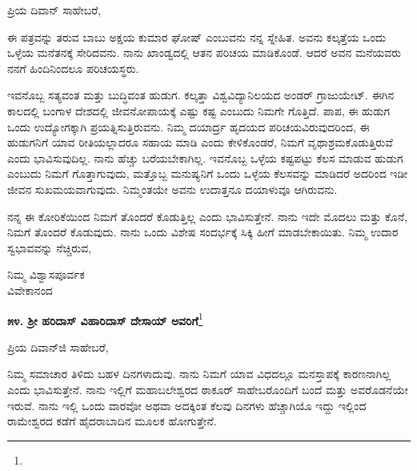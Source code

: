 \vspace{-0.35cm}

\noindent
ಪ್ರಿಯ ದಿವಾನ್ ಸಾಹೇಬರೆ,

ಈ ಪತ್ರವನ್ನು ತರುವ ಬಾಬು ಅಕ್ಷಯ ಕುಮಾರ ಘೋಷ್ ಎಂಬುವನು ನನ್ನ ಸ್ನೇಹಿತ. ಅವನು ಕಲ್ಕತ್ತೆಯ ಒಂದು ಒಳ್ಳೆಯ ಮನೆತನಕ್ಕೆ ಸೇರಿದವನು. ನಾನು ಖಾಂಡ್ವದಲ್ಲಿ ಆತನ ಪರಿಚಯ ಮಾಡಿಕೊಂಡೆ. ಆದರೆ ಅವನ ಮನೆಯವರು ನನಗೆ ಹಿಂದಿನಿಂದಲೂ ಪರಿಚಯಸ್ಥರು.

ಇವನೊಬ್ಬ ಸತ್ಯವಂತ ಮತ್ತು ಬುದ್ಧಿವಂತ ಹುಡುಗ. ಕಲ್ಕತ್ತಾ ವಿಶ್ವವಿದ್ಯಾನಿಲಯದ ಅಂಡರ್ ಗ್ರಾಜುಯೇಟ್. ಈಗಿನ ಕಾಲದಲ್ಲಿ ಬಂಗಾಳ ದೇಶದಲ್ಲಿ ಜೀವನೋಪಾಯಕ್ಕೆ ಎಷ್ಟು ಕಷ್ಟ ಎಂಬುದು ನಿಮಗೇ ಗೊತ್ತಿದೆ. ಪಾಪ, ಈ ಹುಡುಗ ಒಂದು ಉದ್ಯೋಗಕ್ಕಾಗಿ ಪ್ರಯತ್ನಿಸುತ್ತಿರುವನು. ನಿಮ್ಮ ದಯಾರ್ದ್ರ ಹೃದಯದ ಪರಿಚಯವಿರುವುದರಿಂದ, ಈ ಹುಡುಗನಿಗೆ ಯಾವ ರೀತಿಯಲ್ಲಾದರೂ ಸಹಾಯ ಮಾಡಿ ಎಂದು ಕೇಳಿಕೊಂಡರೆ, ನಿಮಗೆ ವೃಥಾಶ್ರಮಕೊಡುತ್ತಿರುವೆ ಎಂದು ಭಾವಿಸುವುದಿಲ್ಲ. ನಾನು ಹೆಚ್ಚು ಬರೆಯಬೇಕಾಗಿಲ್ಲ. ಇವನೊಬ್ಬ ಒಳ್ಳೆಯ ಕಷ್ಟಪಟ್ಟು ಕೆಲಸ ಮಾಡುವ ಹುಡುಗ ಎಂಬುದು ನಿಮಗೆ ಗೊತ್ತಾಗುವುದು, ಮತ್ತೊಬ್ಬ ಮನುಷ್ಯನಿಗೆ ಒಂದು ಒಳ್ಳೆಯ ಕೆಲಸವನ್ನು ಮಾಡಿದರೆ ಅದರಿಂದ ಇಡೀ ಜೀವನ ಸುಖಮಯವಾಗುವುದು. ನಿಮ್ಮಂತಯೇ ಅವನು ಉದಾತ್ತನೂ ದಯಾಳುವೂ ಆಗಿರುವನು.

ನನ್ನ ಈ ಕೋರಿಕೆಯಿಂದ ನಿಮಗೆ ತೊಂದರೆ ಕೊಡುತ್ತಿಲ್ಲ ಎಂದು ಭಾವಿಸುತ್ತೇನೆ. ನಾನು ಇದೇ ಮೊದಲು ಮತ್ತು ಕೊನೆ, ನಿಮಗೆ ತೊಂದರೆ ಕೊಡುವುದು. ನಾನು ಒಂದು ವಿಶೇಷ ಸಂದರ್ಭಕ್ಕೆ ಸಿಕ್ಕಿ ಹೀಗೆ ಮಾಡಬೇಕಾಯಿತು. ನಿಮ್ಮ ಉದಾರ ಸ್ವಭಾವವನ್ನು ನೆಚ್ಚಿರುವ,

\vspace{-0.35cm}

{\flushright
ನಿಮ್ಮ ವಿಶ್ವಾಸಪೂರ್ವಕ\\ವಿವೇಕಾನಂದ\par}

\begin{center}
\textbf{೫೪. ಶ‍್ರೀ ಹರಿದಾಸ್ ವಿಹಾರಿದಾಸ್ ದೇಸಾಯ್ ಅವರಿಗೆ}\footnote{}
\end{center}

\vspace{-0.65cm}

\begin{flushright}
{\fontsize{11pt}{11pt}\selectfont{ಪೂನಾ\\[-2pt] ೧೫ನೇ ಜೂನ್ ೧೮೯೨}}
\end{flushright}

\vspace{-0.35cm}

\noindent
ಪ್ರಿಯ ದಿವಾನ್‌ಜಿ ಸಾಹೇಬರೆ,

ನಿಮ್ಮ ಸಮಾಚಾರ ತಿಳಿದು ಬಹಳ ದಿನಗಳಾದುವು. ನಾನು ನಿಮಗೆ ಯಾವ ವಿಧದಲ್ಲೂ ಮನಸ್ತಾಪಕ್ಕೆ ಕಾರಣನಾಗಿಲ್ಲ ಎಂದು ಭಾವಿಸುತ್ತೇನೆ. ನಾನು ಇಲ್ಲಿಗೆ ಮಹಾಬಲೇಶ್ವರದ ಠಾಕೂರ್ ಸಾಹೇಬರೊಂದಿಗೆ ಬಂದೆ ಮತ್ತು ಅವರೊಡನೆಯೇ ಇರುವೆ. ನಾನು ಇಲ್ಲಿ ಒಂದು ವಾರವೋ ಅಥವಾ ಅದಕ್ಕಿಂತ ಕೆಲವು ದಿನಗಳು ಹೆಚ್ಚಾಗಿಯೊ ಇದ್ದು ಇಲ್ಲಿಂದ ರಾಮೇಶ್ವರದ ಕಡೆಗೆ ಹೈದರಾಬಾದಿನ ಮೂಲಕ ಹೋಗುತ್ತೇನೆ.


